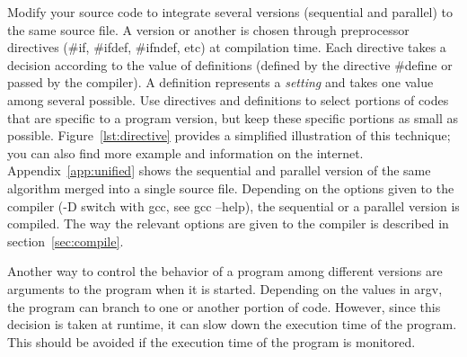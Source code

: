 
Modify your source code to integrate several versions (sequential and parallel) to the same source file. A version or another is chosen through preprocessor directives (\#if, \#ifdef, \#ifndef, etc) at compilation time. Each directive takes a decision according to the value of definitions (defined by the directive \#define or passed by the compiler). A definition represents a \emph{setting} and takes one value among several possible. Use directives and definitions to select portions of codes that are specific to a program version, but keep these specific portions as small as possible. Figure~\ref{lst:directive} provides a simplified illustration of this technique; you can also find more example and information on the internet. Appendix~\ref{app:unified} shows the sequential and parallel version of the same algorithm merged into a single source file. Depending on the options given to the compiler (-D switch with gcc, see gcc --help), the sequential or a parallel version is compiled. The way the relevant options are given to the compiler is described in section~\ref{sec:compile}.

Another way to control the behavior of a program among different versions are arguments to the program when it is started. Depending on the values in argv, the program can branch to one or another portion of code. However, since this decision is taken at runtime, it can slow down the execution time of the program. This should be avoided if the execution time of the program is monitored.

